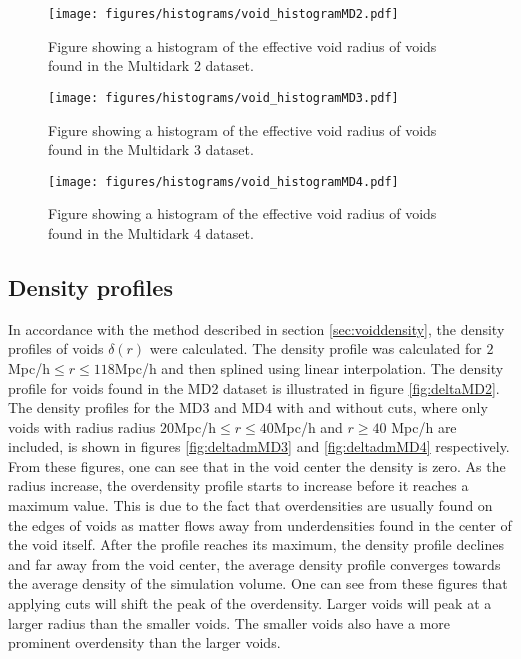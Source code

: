 \begin{figure}[H]
    \texttt{[image: figures/histograms/void\_histogramMD2.pdf]}
    \caption{Figure showing a histogram of the effective void radius of voids found in the Multidark 2 dataset.}
    \label{fig:voidhistMD2}
\end{figure}
\begin{figure}[H]
    \texttt{[image: figures/histograms/void\_histogramMD3.pdf]}
    \caption{Figure showing a histogram of the effective void radius of voids found in the Multidark 3 dataset.}
    \label{fig:voidhistMD3}
\end{figure}
\begin{figure}[H]
    \texttt{[image: figures/histograms/void\_histogramMD4.pdf]}
    \caption{Figure showing a histogram of the effective void radius of voids found in the Multidark 4 dataset.}
    \label{fig:voidhistMD4}
\end{figure}
\subsection{Density profiles}
In accordance with the method described in section \ref{sec:voiddensity}, the density profiles of voids $\delta(r)$ were calculated. The density profile was calculated for $2$Mpc/h$\leq r\leq 118$Mpc/h and then splined using linear interpolation. The density profile for voids found in the MD2 dataset is illustrated in figure \ref{fig:deltaMD2}. The density profiles for the MD3 and MD4 with and without cuts, where only voids with radius radius $20$Mpc/h$\leq r\leq 40$Mpc/h and $r\geq 40$ Mpc/h are included, is shown in figures \ref{fig:deltadmMD3} and \ref{fig:deltadmMD4} respectively. From these figures, one can see that in the void center the density is zero. As the radius increase, the overdensity profile starts to increase before it reaches a maximum value. This is due to the fact that overdensities are usually found on the edges of voids as matter flows away from underdensities found in the center of the void itself. After the profile reaches its maximum, the density profile declines and far away from the void center, the average density profile converges towards the average density of the simulation volume. One can see from these figures that applying cuts will shift the peak of the overdensity. Larger voids will peak at a larger radius than the smaller voids. The smaller voids also have a more prominent overdensity than the larger voids.\\\indent
 


